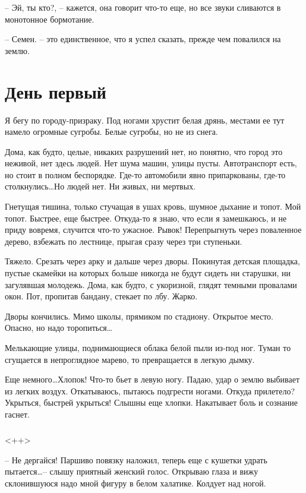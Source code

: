 \documentclass[a4paper]{book}
\begin{document}
-- Эй, ты кто?, -- кажется, она говорит что-то еще, но все звуки сливаются в монотонное бормотание.

-- Семен. -- это единственное, что я успел сказать, прежде чем повалился на землю. 

\chapter{День первый}

Я бегу по городу-призраку. Под ногами хрустит белая дрянь, местами ее тут намело огромные сугробы. Белые сугробы, но не из снега. 

Дома, как будто, целые, никаких разрушений нет, но понятно, что город это неживой, нет здесь людей. Нет шума машин, улицы пусты. Автотранспорт есть, но стоит в полном беспорядке. Где-то автомобили явно припаркованы, где-то столкнулись\ldots Но людей нет. Ни живых, ни мертвых.

Гнетущая тишина, только стучащая в ушах кровь, шумное дыхание и топот. Мой топот. Быстрее, еще быстрее. Откуда-то я знаю, что если я замешкаюсь, и не приду вовремя, случится что-то ужасное.  Рывок! Перепрыгнуть через поваленное дерево, взбежать по лестнице, прыгая сразу через три ступеньки. 

Тяжело. Срезать через арку и дальше через дворы. Покинутая детская площадка, пустые скамейки на которых больше никогда не будут сидеть ни старушки, ни загулявшая молодежь. Дома, как будто, с укоризной, глядят темными провалами окон. Пот, пропитав бандану, стекает по лбу. Жарко. 

Дворы кончились. Мимо школы, прямиком по стадиону. Открытое место. Опасно, но надо торопиться\ldots 

Мелькающие улицы, поднимающиеся облака белой пыли из-под ног. Туман то сгущается в непроглядное марево, то превращается в легкую дымку. 

Еще немного\ldots Хлопок! Что-то бьет в левую ногу. Падаю, удар о землю выбивает из легких воздух. Откатываюсь, пытаюсь подгрести ногами. Откуда прилетело? Укрыться, быстрей укрыться! Слышны еще хлопки. Накатывает боль и сознание гаснет.
\\
\paragraph{}<++>
 

-- Не дергайся! Паршиво повязку наложил, теперь еще с кушетки удрать пытается\ldots -- слышу приятный женский голос. Открываю глаза и вижу склонившуюся надо мной фигуру в белом халатике. Колдует над ногой. 
\end{document}
